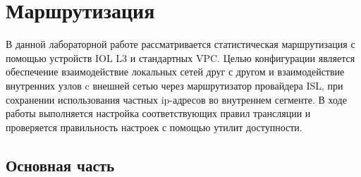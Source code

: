 \chapter{Маршрутизация}
\label{ch:chap4}

В данной лабораторной работе рассматривается статистическая маршрутизация с помощью устройств IOL L3 и стандартных VPC. Целью конфигурации является обеспечение взаимодействие локальных сетей друг с другом и взаимодействие внутренних узлов c внешней сетью через маршрутизатор провайдера ISL, при сохранении использования частных ip-адресов во внутреннем сегменте. В ходе работы выполняется настройка соответствующих правил трансляции и проверяется правильность настроек с помощью утилит доступности.

\section{Основная часть}

